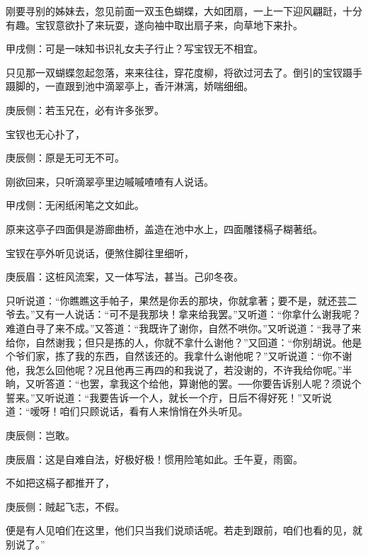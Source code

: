 \begin{parag}
    刚要寻别的姊妹去，忽见前面一双玉色蝴蝶，大如团扇，一上一下迎风翩跹，十分有趣。宝钗意欲扑了来玩耍，遂向袖中取出扇子来，向草地下来扑。\begin{note}甲戌侧：可是一味知书识礼女夫子行止？写宝钗无不相宜。\end{note}只见那一双蝴蝶忽起忽落，来来往往，穿花度柳，将欲过河去了。倒引的宝钗蹑手蹑脚的，一直跟到池中滴翠亭上，香汗淋漓，娇喘细细。\begin{note}庚辰侧：若玉兄在，必有许多张罗。\end{note}宝钗也无心扑了，\begin{note}庚辰侧：原是无可无不可。\end{note}刚欲回来，只听滴翠亭里边嘁嘁喳喳有人说话。\begin{note}甲戌侧：无闲纸闲笔之文如此。\end{note}原来这亭子四面俱是游廊曲桥，盖造在池中水上，四面雕镂槅子糊著纸。
\end{parag}


\begin{parag}
    宝钗在亭外听见说话，便煞住脚往里细听，\begin{note}庚辰眉：这桩风流案，又一体写法，甚当。己卯冬夜。\end{note}只听说道：“你瞧瞧这手帕子，果然是你丢的那块，你就拿著；要不是，就还芸二爷去。”又有一人说话：“可不是我那块！拿来给我罢。”又听道：“你拿什么谢我呢？难道白寻了来不成。”又答道：“我既许了谢你，自然不哄你。”又听说道：“我寻了来给你，自然谢我；但只是拣的人，你就不拿什么谢他？”又回道：“你别胡说。他是个爷们家，拣了我的东西，自然该还的。我拿什么谢他呢？”又听说道：“你不谢他，我怎么回他呢？况且他再三再四的和我说了，若没谢的，不许我给你呢。”半晌，又听答道：“也罢，拿我这个给他，算谢他的罢。──你要告诉别人呢？须说个誓来。”又听说道：“我要告诉一个人，就长一个疔，日后不得好死！”又听说道：“嗳呀！咱们只顾说话，看有人来悄悄在外头听见。\begin{note}庚辰侧：岂敢。\end{note}\begin{note}庚辰眉：这是自难自法，好极好极！惯用险笔如此。壬午夏，雨窗。\end{note}不如把这槅子都推开了，\begin{note}庚辰侧：贼起飞志，不假。\end{note}便是有人见咱们在这里，他们只当我们说顽话呢。若走到跟前，咱们也看的见，就别说了。”
\end{parag}


